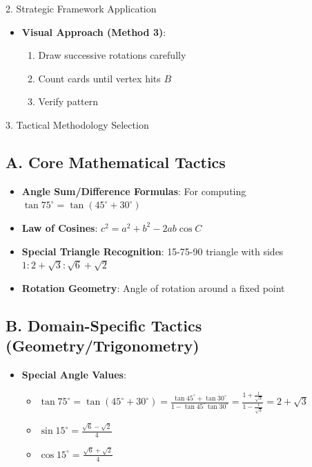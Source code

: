 \documentclass[12pt]{article}
\begin{document}
\begin{strategybox}{2. Strategic Framework Application}
\begin{itemize}[leftmargin=*]
    \item \textbf{Visual Approach (Method 3)}:
    \begin{enumerate}
        \item Draw successive rotations carefully
        \item Count cards until vertex hits $B$
        \item Verify pattern
    \end{enumerate}
\end{itemize}

\end{strategybox}

\begin{tacticsbox}{3. Tactical Methodology Selection}

\subsection*{A. Core Mathematical Tactics}
\begin{itemize}[leftmargin=*]
    \item \textbf{Angle Sum/Difference Formulas}: For computing $\tan 75^\circ = \tan(45^\circ + 30^\circ)$
    
    \item \textbf{Law of Cosines}: $c^2 = a^2 + b^2 - 2ab\cos C$
    
    \item \textbf{Special Triangle Recognition}: 15-75-90 triangle with sides $1 : 2+\sqrt{3} : \sqrt{6}+\sqrt{2}$
    
    \item \textbf{Rotation Geometry}: Angle of rotation around a fixed point
\end{itemize}

\subsection*{B. Domain-Specific Tactics (Geometry/Trigonometry)}
\begin{itemize}[leftmargin=*]
    \item \textbf{Special Angle Values}:
    \begin{itemize}
        \item $\tan 75^\circ = \tan(45^\circ + 30^\circ) = \frac{\tan 45^\circ + \tan 30^\circ}{1 - \tan 45^\circ \tan 30^\circ} = \frac{1 + \frac{1}{\sqrt{3}}}{1 - \frac{1}{\sqrt{3}}} = 2+\sqrt{3}$
        \item $\sin 15^\circ = \frac{\sqrt{6}-\sqrt{2}}{4}$
        \item $\cos 15^\circ = \frac{\sqrt{6}+\sqrt{2}}{4}$
    \end{itemize}
    

\end{itemize}
\end{tacticsbox}
\end{document}
